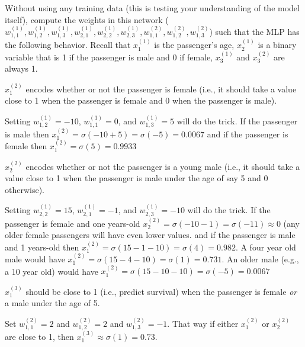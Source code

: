 \documentclass[assignment06_Solutions]{subfiles}
\begin{document}
\begin{exercise}[(30 minutes)]
Without using any training data (this is testing your understanding of the model itself), compute the weights in this network ($w^{(1)}_{1,1}, w^{(1)}_{1,2}, w^{(1)}_{1,3}, w^{(1)}_{2,1}, w^{(1)}_{2,2}, w^{(1)}_{2,3}, w^{(2)}_{1,1}, w^{(2)}_{1,2}, w^{(2)}_{1,3}$) such that the MLP has the following behavior.  Recall that $x^{(1)}_1$ is the passenger's age, $x^{(1)}_2$ is a binary variable that is 1 if the passenger is male and 0 if female, $x^{(1)}_3$ and $x^{(2)}_3$ are always 1.
\bes
\item $x^{(2)}_1$ encodes whether or not the passenger is female (i.e., it should take a value close to 1 when the passenger is female and 0 when the passenger is male).
\begin{boxedsolution}
Setting $w^{(1)}_{1,2} = -10$, $w^{(1)}_{1,1} = 0$, and $w^{(1)}_{1,3} = 5$ will do the trick.  If the passenger is male then $x^{(2)}_1 = \sigma(-10 + 5) = \sigma(-5) = 0.0067$ and if the passenger is female then $x^{(2)}_1 = \sigma(5) = 0.9933$
\end{boxedsolution}
\item $x^{(2)}_2$ encodes whether or not the passenger is a young male (i.e., it should take a value close to 1 when the passenger is male under the age of say 5 and 0 otherwise).
\begin{boxedsolution}
Setting $w^{(1)}_{2,2} = 15$, $w^{(1)}_{2,1} = -1$, and $w^{(1)}_{2,3} = -10$ will do the trick.  If the passenger is female and one years-old $x^{(2)}_2 = \sigma(-10 - 1) = \sigma(-11) \approx 0$ (any older female passengers will have even lower values. and if the passenger is male and 1 years-old then $x^{(2)}_1 = \sigma(15 - 1 - 10) = \sigma(4) = 0.982$.  A four year old male would have $x^{(2)}_1 = \sigma(15 - 4 - 10) = \sigma(1) = 0.731$.  An older male (e.g., a 10 year old) would have $x^{(2)}_1 = \sigma(15 - 10 - 10) = \sigma(-5) = 0.0067$
\end{boxedsolution}
\item $x^{(3)}_1$ should be close to 1 (i.e., predict survival) when the passenger is female \emph{or} a male under the age of 5.
\begin{boxedsolution}
Set $w^{(2)}_{1,1} = 2$ and $w^{(2)}_{1,2} = 2$ and $w^{(2)}_{1,3} = -1$.  That way if either $x^{(2)}_1$ or $x^{(2)}_2$ are close to 1, then $x^{(3)}_1 \approx \sigma(1) = 0.73$.
\end{boxedsolution}
\ees
\end{exercise}
\end{document}
